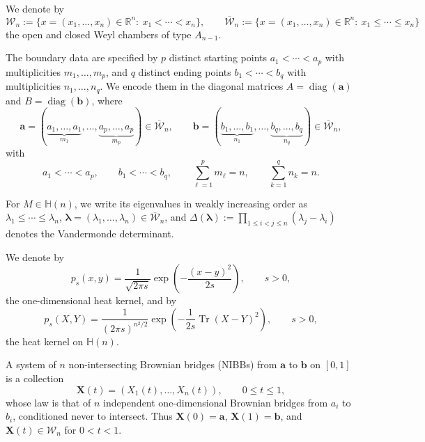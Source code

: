 \documentclass[11pt,a4paper]{article}
\theoremstyle{definition}\newtheorem{definition}[theorem]{Definition}
\theoremstyle{remark}\newtheorem{remark}[theorem]{Remark}
\numberwithin{equation}{section}
\DeclareMathOperator{\Tr}{Tr}
\DeclareMathOperator{\diag}{diag}
\newcommand{\R}{\mathbb{R}}
\newcommand{\HH}{\mathbb{H}(n)}
\begin{document}
We denote by
\begin{equation*}
\mathcal W_n:=\{x=(x_1,\dots,x_n)\in\R^n:\ x_1<\cdots<x_n\},
\qquad
\overline{\mathcal W}_n:=\{x=(x_1,\dots,x_n)\in\R^n:\ x_1\le\cdots\le x_n\}
\end{equation*}
the open and closed Weyl chambers of type $A_{n-1}$.

The boundary data are specified by $p$ distinct starting points
$a_1<\cdots<a_p$ with multiplicities $m_1,\dots,m_p$, and
$q$ distinct ending points $b_1<\cdots<b_q$ with multiplicities
$n_1,\dots,n_q$. We encode them in the diagonal matrices
$A=\diag(\bm a)$ and $B=\diag(\bm b)$, where
\begin{equation}
\bm a=
(\underbrace{a_1,\dots,a_1}_{m_1},\dots,\underbrace{a_p,\dots,a_p}_{m_p})
\in\overline{\mathcal W}_n,
\qquad
\bm b=
(\underbrace{b_1,\dots,b_1}_{n_1},\dots,\underbrace{b_q,\dots,b_q}_{n_q})
\in\overline{\mathcal W}_n,
\end{equation}
with
\begin{equation}
a_1<\cdots<a_p,
\qquad
b_1<\cdots<b_q,
\qquad
\sum_{\ell=1}^p m_\ell=n,
\qquad
\sum_{k=1}^q n_k=n.
\end{equation}

For $M\in\HH$, we write its eigenvalues in weakly increasing order as
$\lambda_1\le \cdots\le \lambda_n$,
$\bm\lambda=(\lambda_1,\dots,\lambda_n)\in\overline{\mathcal W}_n$,
and $\Delta(\bm\lambda):=\prod_{1\le i<j\le n}(\lambda_j-\lambda_i)$ denotes the Vandermonde determinant.

 

We denote by
\begin{equation}
p_s(x,y)=\frac{1}{\sqrt{2\pi s}}
\exp\!\left(-\frac{(x-y)^2}{2s}\right),
\qquad s>0,
\end{equation}
the one-dimensional heat kernel, and by
\begin{equation}
p_s(X,Y)=\frac{1}{(2\pi s)^{n^2/2}}
\exp\!\left(-\frac{1}{2s}\Tr(X-Y)^2\right),
\qquad s>0,
\end{equation}
the heat kernel on $\HH$.

 
A system of $n$ non-intersecting Brownian bridges (NIBBs) from $\bm a$ to
$\bm b$ on $[0,1]$ is a collection
\begin{equation}
\bm X(t)=(X_1(t),\dots,X_n(t)),\qquad 0\le t\le 1,
\end{equation}
whose law is that of $n$ independent one-dimensional Brownian bridges
from $a_i$ to $b_i$, conditioned never to intersect. Thus $\bm X(0)=\bm a$, $\bm X(1)=\bm b$, and $\bm X(t)\in \mathcal W_n$ for $0<t<1$.
 
\end{document}
